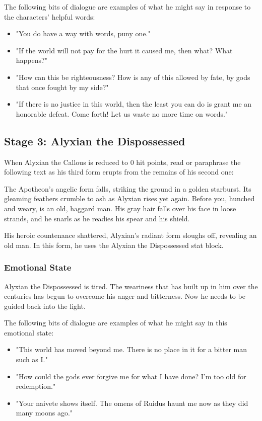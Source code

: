 \documentclass[10pt,a4paper,twoside,bg=print,twocolumn,openany,nodeprecatedcode]{dndbook}
\begin{document}
The following bits of dialogue are examples of what he might say in response to the characters' helpful words:


\begin{itemize}
\item "You do have a way with words, puny one."
\item "If the world will not pay for the hurt it caused me, then what? What happens?"
\item "How can this be righteousness? How is any of this allowed by fate, by gods that once fought by my side?"
\item "If there is no justice in this world, then the least you can do is grant me an honorable defeat. Come forth! Let us waste no more time on words."
\end{itemize}

\subsection{Stage 3: Alyxian the Dispossessed}
When Alyxian the Callous is reduced to 0 hit points, read or paraphrase the following text as his third form erupts from the remains of his second one:

\begin{DndReadAloud}{}
The Apotheon's angelic form falls, striking the ground in a golden starburst. Its gleaming feathers crumble to ash as Alyxian rises yet again. Before you, hunched and weary, is an old, haggard man. His gray hair falls over his face in loose strands, and he snarls as he readies his spear and his shield.

\end{DndReadAloud}

His heroic countenance shattered, Alyxian's radiant form sloughs off, revealing an old man. In this form, he uses the Alyxian the Dispossessed stat block.


\subsubsection{Emotional State}
Alyxian the Dispossessed is tired. The weariness that has built up in him over the centuries has begun to overcome his anger and bitterness. Now he needs to be guided back into the light.

The following bits of dialogue are examples of what he might say in this emotional state:


\begin{itemize}
\item "This world has moved beyond me. There is no place in it for a bitter man such as I."
\item "How could the gods ever forgive me for what I have done? I'm too old for redemption."
\item "Your naivete shows itself. The omens of Ruidus haunt me now as they did many moons ago."
\end{itemize}
\end{document}
